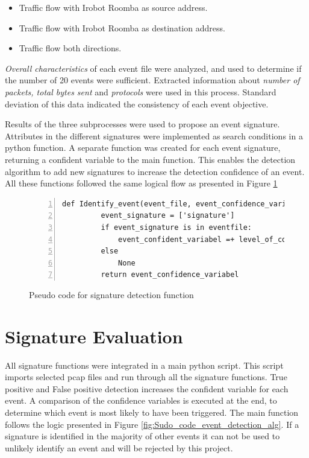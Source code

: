 \begin{itemize}
    \item Traffic flow with Irobot Roomba as source address.
    \item Traffic flow with Irobot Roomba as destination address.
    \item Traffic flow both directions.
\end{itemize}

\textit{Overall characteristics} of each event file were analyzed, and used to determine if the number of 20 events were sufficient. Extracted information about \textit{number of packets, total bytes sent} and \textit{protocols} were used in this process. Standard deviation of this data indicated the consistency of each event objective. 

Results of the three subprocesses were used to propose an event signature. Attributes in the different signatures were implemented as search conditions in a python function. A separate function was created for each event signature, returning a confident variable to the main function. This enables the detection algorithm to add new signatures to increase the detection confidence of an event. All these functions followed the same logical flow as presented in Figure \ref{fig:Sudo_code_signature_function}

\begin{figure}[H]
    \centering
    \caption{Pseudo code for signature detection function}
    \label{fig:Sudo_code_signature_function}
    \begin{lstlisting}[numbers=left]
     def Identify_event(event_file, event_confidence_variable):
         event_signature = ['signature']
         if event_signature is in eventfile:
             event_confident_variabel =+ level_of_confidece
         else
             None
         return event_confidence_variabel
    \end{lstlisting}
\end{figure}

\section{Signature Evaluation}
All signature functions were integrated in a main python script. This script imports selected pcap files and run through all the signature functions. True positive and False positive detection increases the confident variable for each event. A comparison of the confidence variables is executed at the end, to determine which event is most likely to have been triggered. The main function follows the logic presented in Figure \ref{fig:Sudo_code_event_detection_alg}. If a signature is identified in the majority of other events it can not be used to unlikely identify an event and will be rejected by this project. 

